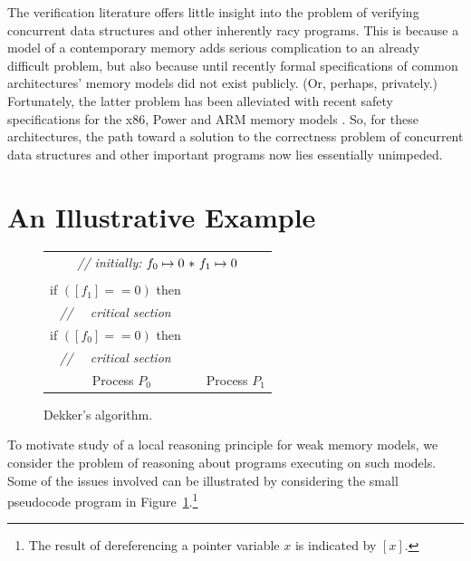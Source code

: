 \documentclass[11pt]{report}         %
\begin{document}
The verification literature offers little insight into the problem of verifying concurrent data structures and other inherently racy programs. This is because a model of a contemporary memory adds serious complication to an already difficult problem, but also because until recently formal specifications of common architectures' memory models did not exist publicly. (Or, perhaps, privately.) Fortunately, the latter problem has been alleviated with recent safety specifications for the x86, Power and ARM memory models \cite{DBLP:conf/tphol/OwensSS09,DBLP:conf/popl/2009damp}. So, for these architectures, the path toward a solution to the correctness problem of concurrent data structures and other important programs now lies essentially unimpeded.

\section{An Illustrative Example}
\label{sec:intro-ex}

\begin{figure}[h]
\centering
\begin{tabular}{cc||cc}
  \multicolumn{4}{c}{\textit{// initially:} $f_0 \mapsto 0 \operatorname{\,\ast\,} f_1 \mapsto
  0$}\vspace{0.5em}\\

  \begin{minipage}{0.25\textwidth}
    $\left[f_0\right] := 1;$ \\
    if $(\left[f_1\right] == 0)$ then\\
    \textit{// ~~critical section}
  \end{minipage} & \hspace{0.5cm} & \hspace{0.5cm} &
  \begin{minipage}{0.25\textwidth}
    $\left[f_1\right] := 1;$ \\
    if $(\left[f_0\right] == 0)$ then\\
    \textit{// ~~critical section}
  \end{minipage}\vspace{1em}\\
  \multicolumn{2}{c}{Process $P_0$} & \multicolumn{2}{c}{Process
  $P_1$}\\
\end{tabular}
\caption{\label{fig:dekker} Dekker's algorithm.}
\end{figure}

To motivate study of a local reasoning principle for weak memory models, we consider the problem of reasoning about programs executing on such models. Some of the issues involved can be illustrated by considering the small pseudocode program in Figure~\ref{fig:dekker}.\footnote{The result of dereferencing a pointer variable $x$ is indicated by $\left[ x \right]$.}
\end{document}
